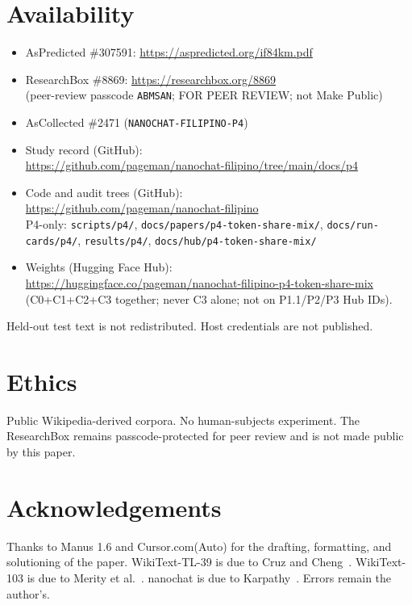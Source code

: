 \documentclass[11pt,a4paper]{article}
\begin{document}
\section*{Availability}
\begin{itemize}[leftmargin=1.6em,itemsep=0.35em]
\item AsPredicted \#307591: \url{https://aspredicted.org/if84km.pdf}
\item ResearchBox \#8869: \url{https://researchbox.org/8869}\\
(peer-review passcode \texttt{ABMSAN}; FOR PEER REVIEW; not Make Public)
\item AsCollected \#2471 (\texttt{NANOCHAT-FILIPINO-P4})
\item Study record (GitHub):\\
\url{https://github.com/pageman/nanochat-filipino/tree/main/docs/p4}
\item Code and audit trees (GitHub):\\
\url{https://github.com/pageman/nanochat-filipino}\\
P4-only: \texttt{scripts/p4/}, \texttt{docs/papers/p4-token-share-mix/},
\texttt{docs/run-cards/p4/}, \texttt{results/p4/},
\texttt{docs/hub/p4-token-share-mix/}
\item Weights (Hugging Face Hub):\\
\url{https://huggingface.co/pageman/nanochat-filipino-p4-token-share-mix}\\
(C0+C1+C2+C3 together; never C3 alone; not on P1.1/P2/P3 Hub IDs).
\end{itemize}
Held-out test text is not redistributed. Host credentials are not published.

\section*{Ethics}
Public Wikipedia-derived corpora. No human-subjects experiment. The ResearchBox remains passcode-protected for peer review and is not made public by this paper.

\section*{Acknowledgements}
Thanks to Manus 1.6 and Cursor.com(Auto) for the drafting, formatting, and solutioning of the paper. WikiText-TL-39 is due to Cruz and Cheng~\cite{cruz2019eval}. WikiText-103 is due to Merity et al.~\cite{merity2017pointer}. nanochat is due to Karpathy~\cite{karpathy2026nanochat}. Errors remain the author's.
\end{document}
